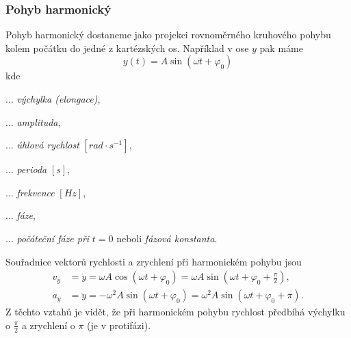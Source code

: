       \subsubsection{Pohyb harmonický}
        Pohyb harmonický dostaneme jako projekci rovnoměrného kruhového pohybu kolem počátku do
        jedné z kartézských os. Například v ose $y$ pak máme
        \begin{equation}\label{mech:eq_p_harmon}
          y(t)=A\sin(\omega t+\varphi_0)
        \end{equation}
        kde 
        \begin{description}[leftmargin=5em,labelindent=2em, style=nextline]
          \item[\(y\)]                     \(\ldots\) \emph{výchylka (elongace)}, 
          \item[\(A\)]                     \(\ldots\) \emph{amplituda}, 
          \item[\(\omega\)]                \(\ldots\) \emph{úhlová rychlost} $[rad\cdot s^{-1}]$,
          \item[\(T=\frac{2\pi}{\omega}\)] \(\ldots\) \emph{perioda} $[s]$, 
          \item[\(f=\frac{1}{T}\)]         \(\ldots\) \emph{frekvence} $[Hz]$, 
          \item[\(\omega t+\varphi_0\)]    \(\ldots\) \emph{fáze}, 
          \item[\(\varphi_0\)]             \(\ldots\) \emph{počáteční fáze při} $t=0$ neboli
                                                      \emph{fázová konstanta}.
        \end{description}
  
        Souřadnice vektorů rychlosti a zrychlení při harmonickém pohybu jsou
        \begin{subequations}
          \label{mech:eq_harm} 
          \begin{align}
            v_y &= \dot{y} 
                 = \omega A\cos(\omega t+\varphi_0 )
                 = \omega A\sin(\omega t+\varphi_0+\frac{\pi}{2}), \label{mech:eq_harm_vy}        \\
            a_y &= \ddot{y} 
                 = -\omega^2A\sin(\omega t+\varphi_0 ) 
                 =  \omega^2A\sin(\omega t+\varphi_0+\pi).          \label{mech:eq_harm_ay}
          \end{align}
        \end{subequations}  
        Z těchto vztahů je vidět, že při harmonickém pohybu rychlost předbíhá výchylku o
        $\frac{\pi}{2}$ a zrychlení o $\pi$ (je v protifázi).

